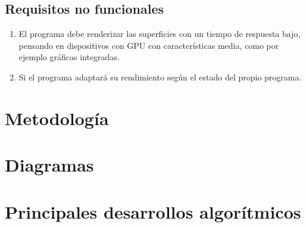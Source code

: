 	\subsection{Requisitos no funcionales}
	\begin{enumerate}
		\item El programa debe renderizar las superficies con un tiempo de respuesta bajo, pensando en dispositivos con GPU con características media, como por ejemplo gráficas integradas.
		\item Si el programa adaptará su rendimiento según el estado del propio programa.
	\end{enumerate}

\section{Metodología}

\section{Diagramas}

\section{Principales desarrollos algorítmicos}

\endinput
